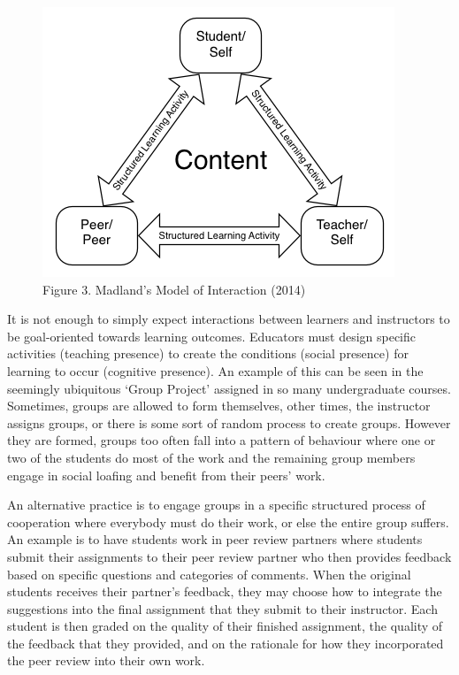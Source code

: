 \documentclass[
]{book}
\begin{document}
\begin{figure}
\centering
\includegraphics{assets/u2/Modes-of-Interaction-Madland.png}
\caption{Figure 3. Madland's Model of Interaction (2014)}
\end{figure}

It is not enough to simply expect interactions between learners and instructors to be goal-oriented towards learning outcomes. Educators must design specific activities (teaching presence) to create the conditions (social presence) for learning to occur (cognitive presence). An example of this can be seen in the seemingly ubiquitous `Group Project' assigned in so many undergraduate courses. Sometimes, groups are allowed to form themselves, other times, the instructor assigns groups, or there is some sort of random process to create groups. However they are formed, groups too often fall into a pattern of behaviour where one or two of the students do most of the work and the remaining group members engage in social loafing and benefit from their peers' work.

An alternative practice is to engage groups in a specific structured process of cooperation where everybody must do their work, or else the entire group suffers. An example is to have students work in peer review partners where students submit their assignments to their peer review partner who then provides feedback based on specific questions and categories of comments. When the original students receives their partner's feedback, they may choose how to integrate the suggestions into the final assignment that they submit to their instructor. Each student is then graded on the quality of their finished assignment, the quality of the feedback that they provided, and on the rationale for how they incorporated the peer review into their own work.
\end{document}
